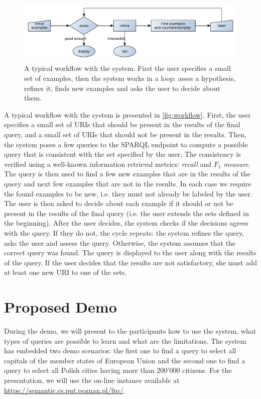 \documentclass{llncs}
\begin{document}
\begin{figure}
\centering
\includegraphics[width=\textwidth]{diagram.pdf}
\caption{A typical workflow with the system.
First the user specifies a small set of examples, then the system works in a loop: asses a hypothesis, refines it, finds new examples and asks the user to decide about them.
}
\label{fig:workflow}
\end{figure}

A typical workflow with the system is presented in \autoref{fig:workflow}.
First, the user specifies a small set of URIs that should be present in the results of the final query, and a small set of URIs that should not be present in the results.
Then, the system poses a few queries to the SPARQL endpoint to compute a possible query that is consistent with the set specified by the user.
The consistency is verified using a well-known information retrieval metrics: \emph{recall} and \emph{$F_1$ measure}.
The query is then used to find a few new examples that are in the results of the query and next few examples that are not in the results.
In each case we require the found examples to be new, i.e. they must not already be labeled by the user.
The user is then asked to decide about each example if it should or not be present in the results of the final query (i.e. the user extends the sets defined in the beginning).
After the user decides, the system checks if the decisions agrees with the query.
If they do not,  the cycle repeats: the system refines the query, asks the user and assess the query.
Otherwise, the system assumes that the correct query was found.
The query is displayed to the user along with the results of the query.
If the user decides that the results are not satisfactory, she must add at least one new URI to one of the sets.




\section{Proposed Demo}

During the demo, we will present to the participants how to use the system, what types of queries are possible to learn and what are the limitations.
The system has embedded two demo scenarios: the first one to find a query to select all capitals of the member states of European Union and the second one to find a query to select all Polish cities having more than $200'000$ citizens.
For the presentation, we will use the on-line instance available at \url{https://semantic.cs.put.poznan.pl/ltq/}.
\end{document}
